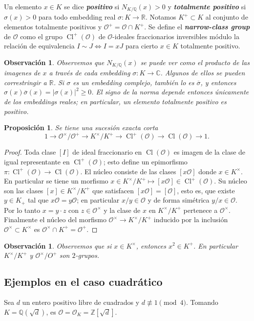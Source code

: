 \documentclass[11pt,a4paper]{amsart}
\newcommand{\C}{\mathbb{C}}
\newcommand{\R}{\mathbb{R}}
\newcommand{\Q}{\mathbb{Q}}
\newcommand{\Z}{\mathbb{Z}}
\renewcommand{\emph}[1]{\textbf{\textit{#1}}}
\DeclareMathOperator{\Cl}{Cl}
\DeclareMathOperator{\CL}{Cl}
\theoremstyle{plain}
\newtheorem{prop}[equation]{Proposición}
\newtheorem{obs}[equation]{Observación}
\renewcommand{\O}{\mathcal{O}}
\begin{document}
Un elemento $x \in K$ se dice \emph{positivo}
si $N_{K/\Q}(x) > 0$ y \emph{totalmente positivo}
si $\sigma(x) > 0$
para todo embedding real $\sigma \colon K \to \R$.
Notamos $K^+ \subset K$
al conjunto de elementos totalmente positivos y
$\O^+ = \O \cap K^+$.
Se define el \emph{narrow-class group} de $\O$ como
el grupo $\Cl^+(\O)$ de $\O$-ideales fraccionarios inversibles
módulo la relación de
equivalencia $I \sim J \iff I = xJ$ para cierto $x \in K$ totalmente
positivo.

\begin{obs} Observemos que $N_{K/\Q}(x)$ se puede ver como el
producto de las imagenes de $x$ a través de cada
\textit{embedding} $\sigma \colon K \to \C$. Algunos de ellos
se pueden correstringir a $\R$. Si $\sigma$ es un embedding complejo,
también lo es $\overline \sigma$, y entonces
$\sigma(x)\overline\sigma(x) = |\sigma(x)|^2 \ge 0$. El signo
de la norma depende entonces únicamente de los embeddings reales; en
particular, un elemento totalmente positivo es positivo.
\end{obs}

\begin{prop} Se tiene una sucesión exacta corta
\[
1 \to \O^\times/\O^+ \to K^\times/K^+ \to
\CL^+(\O) \to \CL(\O) \to 1.
\]
\end{prop}
\begin{proof} Toda clase $[I]$ de ideal fraccionario
en $\CL(\O)$ es imagen de la clase de igual representante en $\CL^+(\O)$;
esto define un epimorfismo $\pi \colon \CL^+(\O)\to\CL(\O)$. El núcleo consiste
de las clases $[x \O]$ donde $x \in K^\times$. En particular se tiene
un morfismo $x\in K^\times/K^+ \mapsto [x \O] \in \CL^+(\O)$.
Su núcleo son las clases $[x] \in K^\times/K^+$ que satisfacen
$[x\O] = [\O]$, esto es, que existe $y \in K_+$ tal que $x \O = y \O$;
en particular $x/y \in \O$ y de forma simétrica $y/x \in \O$.
Por lo tanto $x = y \cdot z$ con $z \in \O^\times$
y la clase de $x$ en $K^\times/K^+$ pertenece a $\O^\times$. Finalmente
el núcleo del morfismo $\O^\times \to K^\times/K^+$ inducido por la inclusión
$\O^\times \subset K^\times$ es $\O^\times \cap K^+ = \O^+$.
\end{proof}

\begin{obs} Observemos que si $x \in K^\times$, entonces $x^2 \in K^+$.
En particular $K^\times/K^+$ y $\O^\times/O^+$ son $2$-grupos.
\end{obs}

\subsection{Ejemplos en el caso cuadrático} Sea $d$ un entero positivo libre de cuadrados y
$d \not \equiv 1 \pmod{4}$. Tomando $K = \Q(\sqrt{d})$, es $\O = \O_K =
\Z[\sqrt{d}]$.
\end{document}
